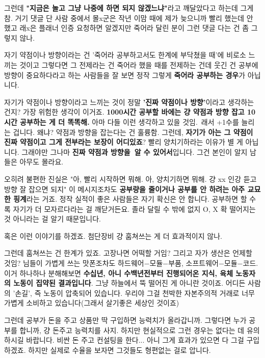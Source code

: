 그런데 \textbf{"지금은 놀고 그냥 나중에 하면 되지 않겠느냐"}라고 깨달았다고 하는데 그게 참.
거기 댓글 단 사람 중에서 몰x군은 작년 이맘 때에 제가 늦으니까 빨리 했는데 안 했고
래x은 플래너 인증 요청하면 알겠지만 죽어라 달린 분이 그런 댓글 다는 건 좀 그렇지 않나.
\vspace{5mm}

자기 약점이나 방향이라는 건 '죽어라 공부하고서도 한계에 부닥쳤을 때'에 비로소 느끼는 것이고
그렇다면 그 전제라는 건 죽어라 했을 때를 전제하는 건데
웃긴 건 공부에 방향이 중요하다라고 하는 사람들을 잘 보면 정작 그렇게 \textbf{죽어라 공부하는 경우}가 아닙니다.
\vspace{5mm}

자기가 약점이나 방향이라고 느끼는 것이 정말 \textbf{'진짜 약점이나 방향'}이라고 생각하는 건지?
가장 위험한 생각이 이거죠.
\textbf{1000시간 공부할 바에는 걍 약점과 방향 잡고 10시간 공부하는 게 더 똑똑해.}
아마 다들 이런 생각하고 있을 것임. 래서 +1수를 늘리는 겁니다.
왜냐? 약점과 방향을 잡는다는 건 훌륭함. 그런데, \textbf{자기가 아는 그 약점이 진짜 약점이고 그게 전부라는 보장이 어디있죠}?
빨리 양치기하라는 이유가 별 게 아닙니다. 그래야만 그나마 \textbf{진짜 약점과 방향을 알 수 있어서}입니다.
그건 본인이 알지 남들은 아무도 몰라요.
\vspace{5mm}

오히려 불편한 진실은 "아, 빨리 시작하면 뭐해. 아, 양치기하면 뭐해. 걍 xx 인강 듣고 방향 잘 잡으면 되지"
이 메시지조차도 \textbf{공부량을 줄이거나 공부를 안 하려는 아주 교묘한 핑계}라는 거죠.
정작 실적이 좋은 사람들은 자기 확신은 안 합니다. 공부하면 할 수록 자기가 더 모자르다라는 걸 깨닫거든요.
졸라 달릴 수 밖에 없지 O, X 확 떨어지는 것 아니라는 걸 알기 때문입니다.
\vspace{5mm}

혹은 이런 이야기를 하겠죠. 첨단장비 걍 훔쳐쓰는 게 더 효과적이지 않나.
\vspace{5mm}

그런데 훔쳐쓰는 건 한계가 있죠. 고장나면 어떡할 거임? 그리고 자가 생산은 언제할 것임?
님들이 가볍게 쓰는 맛폰조차도 하드웨어$-$모듈$-$부품, 소프트웨어$-$모듈$-$코드.
이거 하나하나 분해해보면 \textbf{수십년, 아니 수백년전부터 진행되어온 지식, 육체 노동자의 노동이 집약된 결과입니다}.
그냥 하늘에서 뚝 떨어진 게 아니란 것이죠. 어디든 사람의 '손길', 즉 노동이 압축되어 있습니다.
우리야 그걸 천박한 자본주의적 거래로 너무 가볍게 소비하고 있습니다(그래서 살기좋은 세상인 것이죠)
\vspace{5mm}

그런데 공부가 돈을 주고 상품만 딱 구입하면 능력치가 올라갑니까.
그렇다면 누가 공부를 합니까, 걍 돈주고 능력치를 사지.
하지만 현실적으로 그런 경우는 없다는 데 유의하시길 바랍니다.
비싼 돈 주고 컨설팅을 한다... 아니 그게 효과가 있으면 다 그걸 구입하겠죠.
하지만 실제로 수율을 보자면 그것들도 형편없는 걸로 압니다.
\vspace{5mm}






